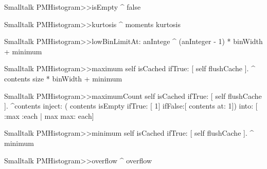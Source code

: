 \begin{displaycode}{Smalltalk}
PMHistogram>>isEmpty
    ^ false
\end{displaycode}

\begin{displaycode}{Smalltalk}
PMHistogram>>kurtosis
    ^ moments kurtosis
\end{displaycode}
  
\begin{displaycode}{Smalltalk}
PMHistogram>>lowBinLimitAt: anIntege
    ^ (anInteger - 1) * binWidth + minimum
\end{displaycode}
  
\begin{displaycode}{Smalltalk}
PMHistogram>>maximum
    self isCached
        ifTrue: [ self flushCache ].
    ^ contents size * binWidth + minimum
\end{displaycode}
  
\begin{displaycode}{Smalltalk}
PMHistogram>>maximumCount
    self isCached
        ifTrue: [ self flushCache ].
    ^contents inject: ( contents isEmpty ifTrue: [ 1] ifFalse:[ 
                                                      contents at: 1])
                    into: [ :max :each | max max: each]
\end{displaycode}
                  
\begin{displaycode}{Smalltalk}
PMHistogram>>minimum
    self isCached
        ifTrue: [ self flushCache ].
    ^ minimum
\end{displaycode}
  
\begin{displaycode}{Smalltalk}
PMHistogram>>overflow
    ^ overflow
\end{displaycode}
  

